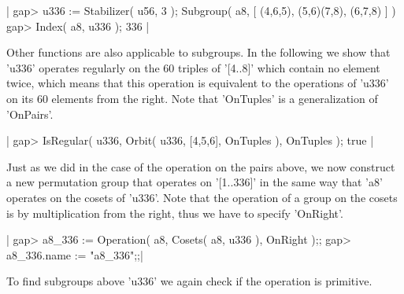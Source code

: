 |    gap> u336 := Stabilizer( u56, 3 );
    Subgroup( a8, [ (4,6,5), (5,6)(7,8), (6,7,8) ] )
    gap> Index( a8, u336 );
    336 |

Other  functions are also applicable to subgroups.   In the  following we
show that 'u336'  operates regularly on the  60 triples of '[4..8]' which
contain no  element  twice, which means that this operation is equivalent
to the operations of 'u336' on its 60 elements from the right.  Note that
'OnTuples' is a generalization of 'OnPairs'.

|    gap> IsRegular( u336, Orbit( u336, [4,5,6], OnTuples ), OnTuples );
    true |

Just as we did in the case  of  the operation on the pairs above, we  now
construct a new permutation group that operates on '[1..336]' in the same
way that 'a8' operates on the cosets of 'u336'.  Note that  the operation
of a group on  the  cosets is by  multiplication from the right, thus  we
have to specify 'OnRight'.

|    gap> a8_336 := Operation( a8, Cosets( a8, u336 ), OnRight );;
    gap> a8_336.name := "a8_336";;|

To find  subgroups above  'u336'  we  again  check if  the  operation  is
primitive.

